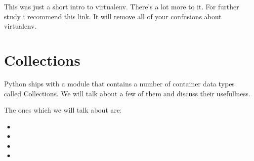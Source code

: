 \documentclass[a4paper,12pt,oneside]{sphinxmanual}
\begin{document}
This was just a short intro to virtualenv. There's a lot more to it. For
further study i recommend \href{http://docs.python-guide.org/en/latest/dev/virtualenvs.html}{this
link.}
It will remove all of your confusions about virtualenv.


\chapter{Collections}
\label{collections:collections}\label{collections::doc}
Python ships with a module that contains a number of container data
types called Collections. We will talk about a few of them and discuss
their usefullness.

The ones which we will talk about are:
\begin{itemize}
\item {} 

\item {} 

\item {} 

\item {} 

\end{itemize}
\end{document}
